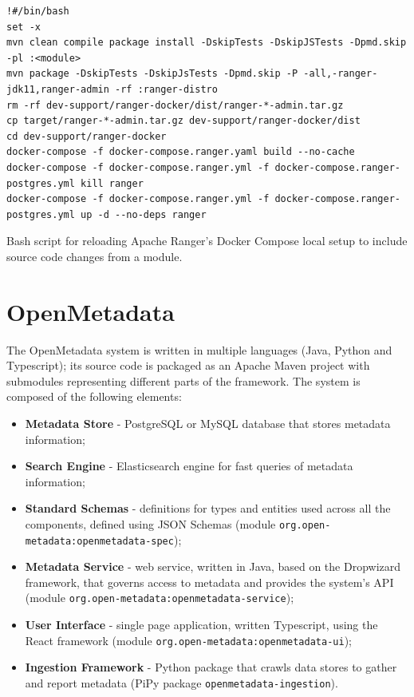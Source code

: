 \begin{listing}
\centering
\begin{verbatim}
!#/bin/bash
set -x
mvn clean compile package install -DskipTests -DskipJSTests -Dpmd.skip -pl :<module>
mvn package -DskipTests -DskipJsTests -Dpmd.skip -P -all,-ranger-jdk11,ranger-admin -rf :ranger-distro
rm -rf dev-support/ranger-docker/dist/ranger-*-admin.tar.gz
cp target/ranger-*-admin.tar.gz dev-support/ranger-docker/dist
cd dev-support/ranger-docker
docker-compose -f docker-compose.ranger.yaml build --no-cache
docker-compose -f docker-compose.ranger.yml -f docker-compose.ranger-postgres.yml kill ranger
docker-compose -f docker-compose.ranger.yml -f docker-compose.ranger-postgres.yml up -d --no-deps ranger
\end{verbatim}
\caption{\label{listing:ranger_module_reload_bash} Bash script for reloading Apache Ranger's Docker Compose local setup to include source code changes from a module.}
\end{listing}

\section{OpenMetadata}

The OpenMetadata system is written in multiple languages (Java, Python and Typescript); its source code is packaged as an Apache Maven project with submodules representing different parts of the framework. The system is composed of the following elements:

\begin{itemize}
    \item \textbf{Metadata Store} - PostgreSQL or MySQL database that stores metadata information;
    \item \textbf{Search Engine} - Elasticsearch engine for fast queries of metadata information;
    \item \textbf{Standard Schemas} - definitions for types and entities used across all the components, defined using JSON Schemas (module \texttt{org.open-metadata:openmetadata-spec});  
    \item \textbf{Metadata Service} - web service, written in Java, based on the Dropwizard framework, that governs access to metadata and provides the system's API (module \texttt{org.open-metadata:openmetadata-service});
    \item \textbf{User Interface} - single page application, written Typescript, using the React framework (module \texttt{org.open-metadata:openmetadata-ui});
    \item \textbf{Ingestion Framework} - Python package that crawls data stores to gather and report metadata (PiPy package \texttt{openmetadata-ingestion}).
\end{itemize}


